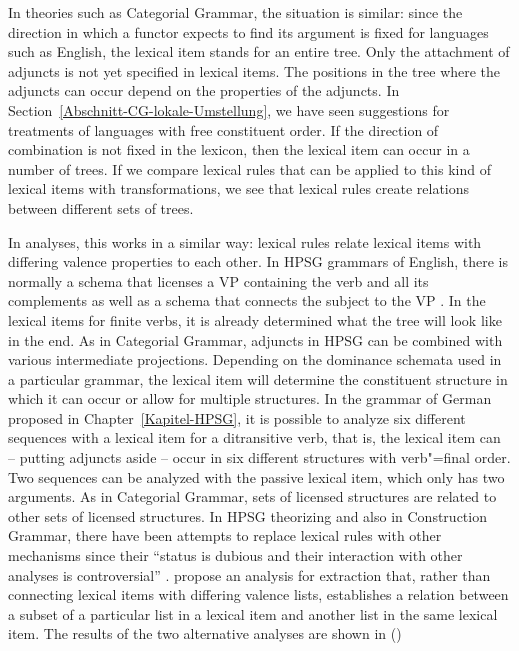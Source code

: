In theories such as Categorial Grammar\indexcg, the situation is similar: since the direction in which a functor expects to find its argument is fixed
for languages such as English, the lexical item stands for an entire tree. Only the attachment of
adjuncts is not yet specified in lexical items. The positions in the
tree where the adjuncts can occur depend on the properties of the adjuncts. In Section~\ref{Abschnitt-CG-lokale-Umstellung},
we have seen suggestions for treatments of languages with free constituent order. If the direction of combination is not fixed in the lexicon, then the lexical item
can occur in a number of trees. If we compare lexical rules that can be applied to this kind of lexical items with transformations, we see that lexical rules create relations
between different sets of trees.

In \hpsg analyses\indexhpsg, this works in a similar way: lexical rules relate lexical items with differing valence properties to each other. In HPSG grammars of English,
there is normally a schema that licenses a VP containing the verb and all its complements as well as a schema that connects the subject to the VP 
\citep[]{ps2}. In the lexical items for finite verbs, it is already determined what the tree will look like in the end. As in Categorial Grammar, adjuncts in HPSG can
be combined with various intermediate projections. Depending on the dominance schemata used in a particular grammar, the lexical item will determine the constituent structure
in which it can occur or allow for multiple structures. In the grammar of German proposed in Chapter~\ref{Kapitel-HPSG}, it is possible to analyze six different sequences with a lexical
item for a ditransitive verb, that is, the lexical item can -- putting adjuncts aside -- occur in six different structures with verb"=final order. Two sequences can be analyzed
with the passive lexical item, which only has two arguments.
As in Categorial Grammar, sets of licensed structures are related to other sets of licensed structures. In HPSG theorizing and also in Construction Grammar, there have been
attempts to replace lexical rules with other mechanisms since their ``status is dubious and their interaction with other analyses is controversial''
\citep*[]{BMS2001a}. \citet*{BMS2001a} propose an analysis for extraction
that, rather than connecting lexical items with differing valence lists, establishes a relation between a subset of a particular list in a lexical item and another
list in the same lexical item. The results of the two alternative analyses are shown in ()
